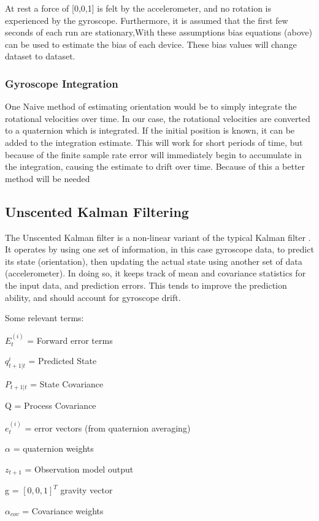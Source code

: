 \documentclass[a4paper]{article}
\begin{document}
At rest a force of [0,0,1] is felt by the accelerometer, and no rotation is experienced by the gyroscope. Furthermore, it is assumed that the first few seconds of each run are stationary,With these assumptions bias equations (above) can be used to estimate the bias of each device. These bias values will change dataset to dataset.

\subsubsection{Gyroscope Integration}

One Naive method of estimating orientation would be to simply integrate the rotational velocities over time. In our case, the rotational velocities are converted to a quaternion which is integrated. If the initial position is known, it can be added to the integration estimate. This will work for short periods of time, but because of the finite sample rate error will immediately begin to accumulate in the integration, causing the estimate to drift over time. Because of this a better method will be needed

\subsection{Unscented Kalman Filtering}

	The Unscented Kalman filter is a non-linear variant of the typical Kalman filter \cite{KRAFT}. It operates by using one set of information, in this case gyroscope data, to predict its state (orientation), then updating the actual state using another set of data (accelerometer). In doing so, it keeps track of mean and covariance statistics for the input data, and prediction errors. This tends to improve the prediction ability, and should account for gyroscope drift.
    
Some relevant terms:

$E_t^{(i)}$ = Forward error terms

$q_{t+1|t}^{i}$ = Predicted State

$P_{t+1|t}$ = State Covariance

Q = Process Covariance

$e_t^{(i)}$ = error vectors (from quaternion averaging)

$\alpha$ =	quaternion weights

$z_{t+1}$ = Observation model output

g = $[0,0,1]^T$ gravity vector

$\alpha_{cov}$ = Covariance weights
\end{document}

